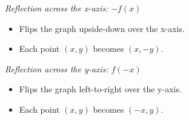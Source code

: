 \emph{Reflection across the x-axis:} \( -f(x) \)
	
\begin{itemize}
	\item Flips the graph upside-down over the x-axis.
	\item Each point \( (x, y) \) becomes \( (x, -y) \).
\end{itemize}

\emph{Reflection across the y-axis:} \( f(-x) \)

\begin{itemize}
	\item Flips the graph left-to-right over the y-axis.
	\item Each point \( (x, y) \) becomes \( (-x, y) \).
\end{itemize}

